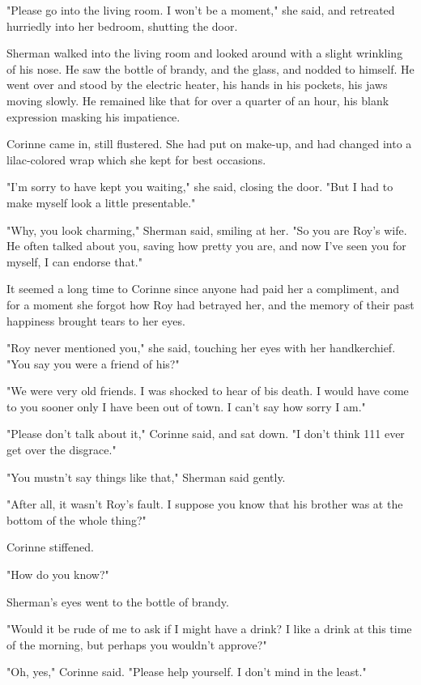 \documentclass{novel}
\begin{document}
"Please go into the living room. I won't be a moment," she said, and retreated hurriedly into her bedroom, shutting the door.

Sherman walked into the living room and looked around with a slight wrinkling of his nose. He saw the bottle of brandy, and the glass, and nodded to himself. He went over and stood by the electric heater, his hands in his pockets, his jaws moving slowly. He remained like that for over a quarter of an hour, his blank expression masking his impatience.

Corinne came in, still flustered. She had put on make-up, and had changed into a lilac-colored wrap which she kept for best occasions.

"I'm sorry to have kept you waiting," she said, closing the door. "But I had to make myself look a little presentable."

"Why, you look charming," Sherman said, smiling at her. "So you are Roy's wife. He often talked about you, saving how pretty you are, and now I've seen you for myself, I can endorse that."

It seemed a long time to Corinne since anyone had paid her a compliment, and for a moment she forgot how Roy had betrayed her, and the memory of their past happiness brought tears to her eyes.

"Roy never mentioned you," she said, touching her eyes with her handkerchief. "You say you were a friend of his?"

"We were very old friends. I was shocked to hear of bis death. I would have come to you sooner only I have been out of town. I can't say how sorry I am."

"Please don't talk about it," Corinne said, and sat down. "I don't think 111 ever get over the disgrace."

"You mustn't  say things like that,"  Sherman said gently.

"After all, it wasn't Roy's fault. I suppose you know that his brother was at the bottom of the whole thing?"

Corinne stiffened.

"How do you know?"

Sherman's eyes went to the bottle of brandy.

"Would it be rude of me to ask if I might have a drink? I like a drink at this time of the morning, but perhaps you wouldn't approve?"

"Oh, yes," Corinne said. "Please help yourself. I don't mind in the least."
\end{document}
